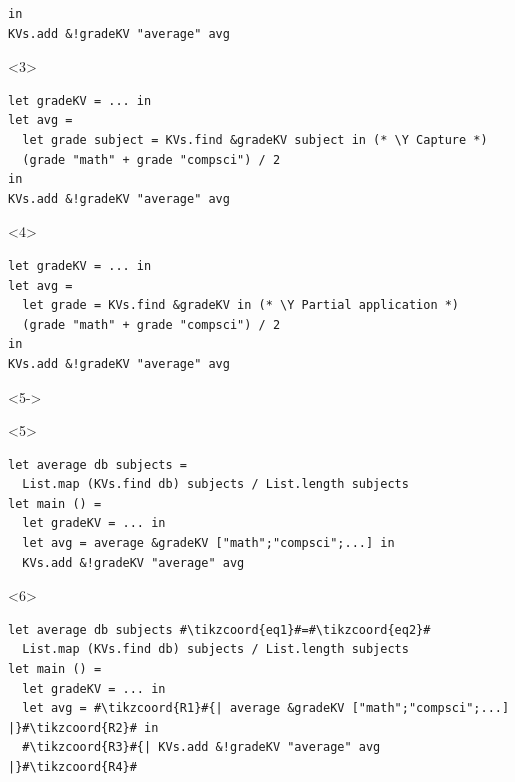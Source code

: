 \documentclass[aspectratio=169,dvipsnames,svgnames,10pt]{beamer}
\newcommand\Y{{\color{Green}{\ding{52}}}}
\begin{document}
\begin{frame}[fragile]
\begin{onlyenv}
\begin{verbatim}
in
KVs.add &!gradeKV "average" avg
\end{verbatim}
  \end{onlyenv}
  \begin{onlyenv}<3>
\begin{verbatim}
let gradeKV = ... in
let avg =
  let grade subject = KVs.find &gradeKV subject in (* \Y Capture *)
  (grade "math" + grade "compsci") / 2
in
KVs.add &!gradeKV "average" avg
\end{verbatim}
  \end{onlyenv}
  \begin{onlyenv}<4>
\begin{verbatim}
let gradeKV = ... in
let avg =
  let grade = KVs.find &gradeKV in (* \Y Partial application *)
  (grade "math" + grade "compsci") / 2
in
KVs.add &!gradeKV "average" avg
\end{verbatim}
  \end{onlyenv}
  \begin{onlyenv}<5->
    \begin{onlyenv}<5>%
\begin{verbatim}
let average db subjects = 
  List.map (KVs.find db) subjects / List.length subjects
let main () =
  let gradeKV = ... in
  let avg = average &gradeKV ["math";"compsci";...] in
  KVs.add &!gradeKV "average" avg
\end{verbatim}
    \end{onlyenv}%
    \begin{onlyenv}<6>%
\begin{verbatim}
let average db subjects #\tikzcoord{eq1}#=#\tikzcoord{eq2}#
  List.map (KVs.find db) subjects / List.length subjects
let main () =
  let gradeKV = ... in
  let avg = #\tikzcoord{R1}#{| average &gradeKV ["math";"compsci";...] |}#\tikzcoord{R2}# in
  #\tikzcoord{R3}#{| KVs.add &!gradeKV "average" avg |}#\tikzcoord{R4}#
\end{verbatim}
    \end{onlyenv}%
  \end{onlyenv}%
\end{frame}
\end{document}

